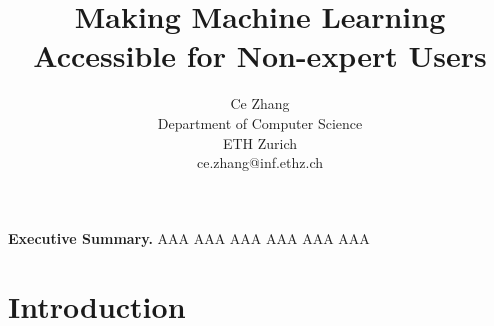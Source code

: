 \documentclass[10pt]{article}
\title{\bf Making Machine Learning
Accessible for Non-expert Users}
\author{Ce Zhang\\Department of Computer Science\\ETH Zurich\\ce.zhang@inf.ethz.ch}
\date{}
\begin{document}
\maketitle
\onehalfspacing

\noindent
{\bf Executive Summary.} 
AAA
AAA
AAA
AAA
AAA
AAA

\newpage
\section{Introduction}
\end{document}
